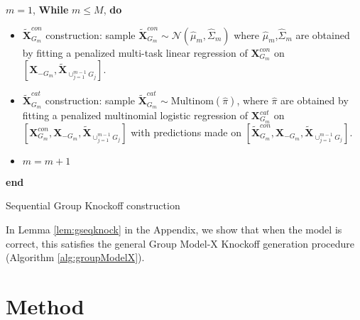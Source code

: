 \documentclass[11pt]{article}
\theoremstyle{plain}
\theoremstyle{definition}
\theoremstyle{remark}
\def\R{\mathbb{R}}
\def\R{\mathbb{R}}
\newcommand{\X}{\mathbf{X}}
\newcommand{\Y}{\mathbf{Y}}
\newcommand{\0}{\mathbf{0}}
\newcommand{\indep}{\perp \!\!\! \perp}
\newcommand{\iidsim}{\stackrel{\mathrm{iid}}{\sim}}
\begin{document}
            
\begin{algorithm}
                
$m=1$, 
\textbf{While} $m\leq M$, \textbf{do}
\begin{itemize}
    \item $\widetilde{\X}^{con}_{G_m}$ construction: sample $\widetilde{\X}^{con}_{G_m} \sim \mathcal{N}(\widehat{\mu}_m,\widehat{\Sigma}_m)$ where $\widehat{\mu}_m$,$\widehat{\Sigma}_m$ are obtained by fitting a penalized multi-task linear regression of $\X^{con}_{G_m}$ on $[\X_{-G_m},\widetilde{\X}_{\cup_{j=1}^{m-1} G_j}]$.
    \item $\widetilde{\X}^{cat}_{G_m}$ construction: sample $\widetilde{\X}^{cat}_{G_m} \sim \text{Multinom}(\widehat{\pi})$, where $\widehat{\pi}$ are obtained by fitting a penalized multinomial logistic regression of $\X^{cat}_{G_m}$ on $[\X^{con}_{G_m},\X_{-G_m},\widetilde{\X}_{\cup_{j=1}^{m-1} G_j}]$ with predictions made on $[\widetilde{\X}^{con}_{G_m},\X_{-G_m},\widetilde{\X}_{\cup_{j=1}^{m-1} G_j}]$.
    \item $m=m+1$
\end{itemize}
\textbf{end}
        
\caption{Sequential Group Knockoff construction
        }
    \label{alg:seqknockoff}
\end{algorithm}
In Lemma \ref{lem:gseqknock} in the Appendix, we show that when the model is correct, this satisfies the general Group Model-X Knockoff generation procedure (Algorithm \ref{alg:groupModelX}).


\section{Method}
\begin{comment}
\subsection{Settings}
Consider $K$ independent datasets $(\Y^1,\X^1),$$\cdots,$$ (\Y^K,\X^K)$, where $\Y^{k}\in \R^{n_k}$ and $\X^k\in \R^{n_k\times p_k}$ for $k \in [K]$ where $(Y^k_{i},X^k_{i1},\cdots,X^k_{ip_k})\iidsim \mathcal{D}^k$ for $k \in [K]$ and $i \in [n_k]$. Without loss of generality, assume $X^k_{ij}$ is either continuous or binary (one dummy variable for a categorical variable) for $k \in [K]$ and $j \in [p_k]$. Within dataset $k$, there are $M$ mutually exclusive groups, denoted as $G_{k1}, \cdots, G_{kM}$ where $G_{km}\subseteq [p_k]$ for all $k \in [K]$ and $m \in [M]$. Define the null hypothesis for the following test of group $m$ in dataset $k$ as $H_{0m}^k:= Y^k \indep X^k_{G_{km}}|X^k_{-G_{km}}$, and the union null hypothesis $H_{0m} :=\cup_{k=1}^KH_{0m}^k$. Our goal is to control the FDR for the $M$ tests for $H_{0m}$s.
\end{comment}
\end{document}
